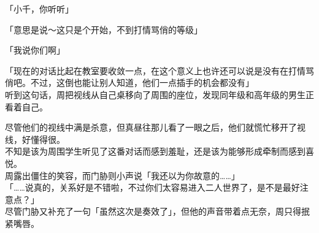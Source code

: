 「小千，你听听」

「意思是说～这只是个开始，不到打情骂俏的等级」

「我说你们啊」

「现在的对话比起在教室要收敛一点，在这个意义上也许还可以说是没有在打情骂俏吧。不过，这倒也能让别人知道，他们一点插手的机会都没有」\\

听到这句话，周把视线从自己桌移向了周围的座位，发现同年级和高年级的男生正看着自己。

尽管他们的视线中满是杀意，但真昼往那儿看了一眼之后，他们就慌忙移开了视线，好懂得很。\\

不知是该为周围学生听见了这番对话而感到羞耻，还是该为能够形成牵制而感到喜悦。\\

周露出僵住的笑容，而门胁则小声说「我还以为你故意的……」\\

「……说真的，关系好是不错啦，不过你们太容易进入二人世界了，是不是最好注意点？」\\

尽管门胁又补充了一句「虽然这次是奏效了」，但他的声音带着点无奈，周只得抿紧嘴唇。
